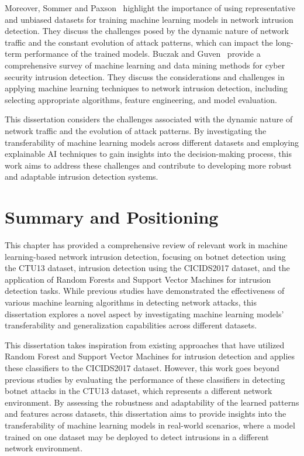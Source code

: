 Moreover, Sommer and Paxson~\cite{sommer2010outside} highlight the importance of using representative and unbiased datasets for training machine learning models in network intrusion detection. They discuss the challenges posed by the dynamic nature of network traffic and the constant evolution of attack patterns, which can impact the long-term performance of the trained models. Buczak and Guven~\cite{buczak2015survey} provide a comprehensive survey of machine learning and data mining methods for cyber security intrusion detection. They discuss the considerations and challenges in applying machine learning techniques to network intrusion detection, including selecting appropriate algorithms, feature engineering, and model evaluation.

This dissertation considers the challenges associated with the dynamic nature of network traffic and the evolution of attack patterns. By investigating the transferability of machine learning models across different datasets and employing explainable AI techniques to gain insights into the decision-making process, this work aims to address these challenges and contribute to developing more robust and adaptable intrusion detection systems.

\section{Summary and Positioning}

This chapter has provided a comprehensive review of relevant work in machine learning-based network intrusion detection, focusing on botnet detection using the CTU13 dataset, intrusion detection using the CICIDS2017 dataset, and the application of Random Forests and Support Vector Machines for intrusion detection tasks. While previous studies have demonstrated the effectiveness of various machine learning algorithms in detecting network attacks, this dissertation explores a novel aspect by investigating machine learning models’ transferability and generalization capabilities across different datasets.

This dissertation takes inspiration from existing approaches that have utilized Random Forest and Support Vector Machines for intrusion detection and applies these classifiers to the CICIDS2017 dataset. However, this work goes beyond previous studies by evaluating the performance of these classifiers in detecting botnet attacks in the CTU13 dataset, which represents a different network environment. By assessing the robustness and adaptability of the learned patterns and features across datasets, this dissertation aims to provide insights into the transferability of machine learning models in real-world scenarios, where a model trained on one dataset may be deployed to detect intrusions in a different network environment.

